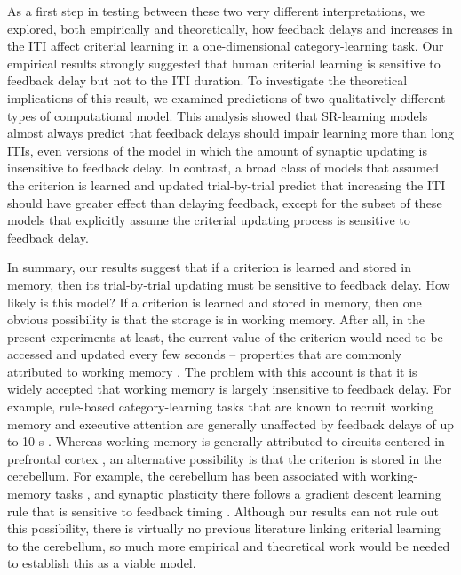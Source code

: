 \documentclass[doc, floatsintext]{apa7}
\begin{document}
As a first step in testing between these two very different
interpretations, we explored, both empirically and
theoretically, how feedback delays and increases in the ITI
affect criterial learning in a one-dimensional
category-learning task. Our empirical results strongly
suggested that human criterial learning is sensitive to
feedback delay but not to the ITI duration. To investigate
the theoretical implications of this result, we examined
predictions of two qualitatively different types of
computational model. This analysis showed that SR-learning
models almost always predict that feedback delays should
impair learning more than long ITIs, even versions of the
model in which the amount of synaptic updating is
insensitive to feedback delay. In contrast, a broad class of
models that assumed the criterion is learned and updated
trial-by-trial predict that increasing the ITI should have
greater effect than delaying feedback, except for the subset
of these models that explicitly assume the criterial
updating process is sensitive to feedback delay.

In summary, our results suggest that if a criterion is
learned and stored in memory, then its trial-by-trial
updating must be sensitive to feedback delay. How likely is
this model? If a criterion is learned and stored in memory,
then one obvious possibility is that the storage is in
working memory. After all, in the present experiments at
least, the current value of the criterion would need to be
accessed and updated every few seconds -- properties that
are commonly attributed to working memory
\parencite[e.g.,][]{Baddeley2010, Oberauer2002}. The problem
with this account is that it is widely accepted that working
memory is largely insensitive to feedback delay. For
example, rule-based category-learning tasks that are known
to recruit working memory and executive attention are
generally unaffected by feedback delays of up to 10 s
\parencite{DunnEtAl2012, ell2009critrial,
MaddoxAshbyBohil2003, MaddoxIng2005,  Worthyetal2013}.
Whereas working memory is generally attributed to circuits
centered in prefrontal cortex
\parencite[e.g.,][]{AshbyEtAl2005, Funahashi2017}, an
alternative possibility is that the criterion is stored in
the cerebellum. For example, the cerebellum has been
associated with working-memory tasks
\parencite[e.g.,][]{AshidaEtAl2019}, and synaptic plasticity
there follows a gradient descent learning rule that is
sensitive to feedback timing \parencite{brudner2016delayed,
held_adaptation_1966, honda_adaptation_2012,
kitazawa_effects_1995, kitazawa_prism_2002}. Although our
results can not rule out this possibility, there is
virtually no previous literature linking criterial learning
to the cerebellum, so much more empirical and theoretical
work would be needed to establish this as a viable model.
\end{document}
